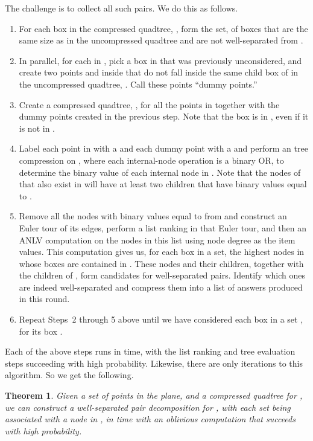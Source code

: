 \documentclass[11pt]{article}
\newtheorem{theorem}{Theorem}
\begin{document}
{The challenge is to collect all such pairs.
We do this as follows.
\begin{enumerate}
\item
For each box  in the compressed quadtree, ,
form the set,  of  boxes 
that are the same size as  in the uncompressed quadtree and are not
well-separated from .
\item
In parallel,
for each  in , pick a box  in  that was previously
unconsidered, 
and create two points  and  inside  that do not fall
inside the same child box of  in the uncompressed quadtree, .
Call these points ``dummy points.''
\item
Create a compressed quadtree, , for all the points in  together
with the dummy points created in the previous step. Note that the
box  is in , even if it is not in .
\item
Label each point in  with a  and each dummy point with a  and
perform an tree compression on , where each internal-node operation
is a binary OR, to determine the binary value of
each internal node in . Note that the nodes of  that also
exist in  will have at least two children that have binary values equal to
. 
\item
Remove all the nodes with binary values equal to  from  and
construct an Euler tour of its edges, perform a list ranking in that Euler
tour, and then an ANLV computation on the nodes in this list using node
degree as the item values.
This computation gives us, for each box  in a  set, the
highest nodes in  whose boxes are contained in .
These nodes and their children, together with the children of , form
candidates for well-separated pairs. Identify which ones are indeed
well-separated and compress them into a list of answers produced in this
round.
\item
Repeat Steps~2 through 5 above until we have considered each 
box in a set , for its box .
\end{enumerate}

Each of the above steps runs in  time, with the list ranking and
tree evaluation steps succeeding with high probability. Likewise, there
are only  iterations to this algorithm. So we get the following.

\begin{theorem}
\label{thm:wspd}
Given a set  of  points in the plane, and a compressed quadtree 
for , we can construct a
well-separated pair decomposition for , with each set being
associated with a node in , in  time with an
oblivious computation that succeeds with high probability.
\end{theorem}



}
\end{document}

